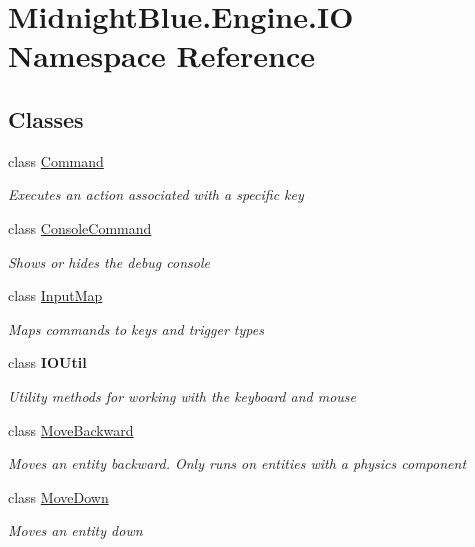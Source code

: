 \hypertarget{namespace_midnight_blue_1_1_engine_1_1_i_o}{}\section{Midnight\+Blue.\+Engine.\+IO Namespace Reference}
\label{namespace_midnight_blue_1_1_engine_1_1_i_o}
\subsection*{Classes}
\begin{DoxyCompactItemize}
\item 
class \hyperlink{class_midnight_blue_1_1_engine_1_1_i_o_1_1_command}{Command}
\begin{DoxyCompactList}\small\item\em Executes an action associated with a specific key \end{DoxyCompactList}\item 
class \hyperlink{class_midnight_blue_1_1_engine_1_1_i_o_1_1_console_command}{Console\+Command}
\begin{DoxyCompactList}\small\item\em Shows or hides the debug console \end{DoxyCompactList}\item 
class \hyperlink{class_midnight_blue_1_1_engine_1_1_i_o_1_1_input_map}{Input\+Map}
\begin{DoxyCompactList}\small\item\em Maps commands to keys and trigger types \end{DoxyCompactList}\item 
class {\bfseries I\+O\+Util}
\begin{DoxyCompactList}\small\item\em Utility methods for working with the keyboard and mouse \end{DoxyCompactList}\item 
class \hyperlink{class_midnight_blue_1_1_engine_1_1_i_o_1_1_move_backward}{Move\+Backward}
\begin{DoxyCompactList}\small\item\em Moves an entity backward. Only runs on entities with a physics component \end{DoxyCompactList}\item 
class \hyperlink{class_midnight_blue_1_1_engine_1_1_i_o_1_1_move_down}{Move\+Down}
\begin{DoxyCompactList}\small\item\em Moves an entity down \end{DoxyCompactList}\item 

\end{DoxyCompactItemize}

